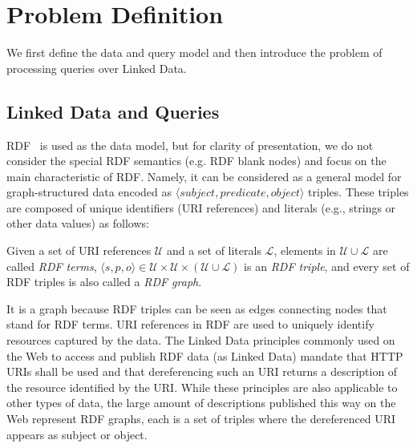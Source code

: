 \section{Problem Definition}
\label{sec:problem}
We first define the data and query model and then
introduce the problem of processing queries over Linked Data.

\subsection{Linked Data and Queries} 
RDF~\cite{klyne_resource_2004} is used
as the data model, but for clarity of presentation, we do not consider
the special RDF semantics (e.g. RDF blank nodes) and focus on the main characteristic of RDF. 
Namely, it can be considered as a general model for
graph-structured data encoded as $\langle subject, predicate, object
\rangle$ triples. These triples are composed of unique identifiers
(URI references) and literals (e.g., strings or other data values) as
follows:


\begin{definition}
  Given a set of URI references $\mathcal{U}$ and a set of literals
  $\mathcal{L}$, elements in $\mathcal{U} \cup
  \mathcal{L}$ are called \emph{RDF terms},
  $\langle s, p, o\rangle \in \mathcal{U}
  \times \mathcal{U} \times (\mathcal{U} \cup \mathcal{L})$ is 
  an \emph{RDF triple}, and every set of RDF triples is also called
  a \emph{RDF graph}.
\end{definition}

It is a graph because RDF triples can be seen 
as edges connecting nodes that stand for RDF terms. URI references in RDF are used to uniquely identify resources captured by the data. 
The Linked Data principles \cite{bizer_linked_2009} commonly used on the Web to access and publish RDF data (as Linked Data) mandate
that HTTP URIs shall be used and that dereferencing such an URI returns a
description of the resource identified by the URI. While these principles are also applicable to other types of data, 
the large amount of descriptions published this way on the Web represent RDF graphs, each is a set of triples where the dereferenced URI appears as subject or object.

